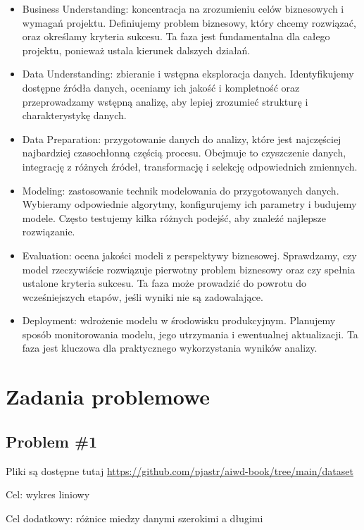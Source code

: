 \documentclass[
  polish,
  letterpaper,
  DIV=11,
  numbers=noendperiod]{scrreprt}
\begin{document}
\begin{itemize}
\item
  Business Understanding: koncentracja na zrozumieniu celów biznesowych
  i wymagań projektu. Definiujemy problem biznesowy, który chcemy
  rozwiązać, oraz określamy kryteria sukcesu. Ta faza jest fundamentalna
  dla całego projektu, ponieważ ustala kierunek dalszych działań.
\item
  Data Understanding: zbieranie i wstępna eksploracja danych.
  Identyfikujemy dostępne źródła danych, oceniamy ich jakość i
  kompletność oraz przeprowadzamy wstępną analizę, aby lepiej zrozumieć
  strukturę i charakterystykę danych.
\item
  Data Preparation: przygotowanie danych do analizy, które jest
  najczęściej najbardziej czasochłonną częścią procesu. Obejmuje to
  czyszczenie danych, integrację z różnych źródeł, transformację i
  selekcję odpowiednich zmiennych.
\item
  Modeling: zastosowanie technik modelowania do przygotowanych danych.
  Wybieramy odpowiednie algorytmy, konfigurujemy ich parametry i
  budujemy modele. Często testujemy kilka różnych podejść, aby znaleźć
  najlepsze rozwiązanie.
\item
  Evaluation: ocena jakości modeli z perspektywy biznesowej. Sprawdzamy,
  czy model rzeczywiście rozwiązuje pierwotny problem biznesowy oraz czy
  spełnia ustalone kryteria sukcesu. Ta faza może prowadzić do powrotu
  do wcześniejszych etapów, jeśli wyniki nie są zadowalające.
\item
  Deployment: wdrożenie modelu w środowisku produkcyjnym. Planujemy
  sposób monitorowania modelu, jego utrzymania i ewentualnej
  aktualizacji. Ta faza jest kluczowa dla praktycznego wykorzystania
  wyników analizy.
\end{itemize}

\part{Zadania problemowe}

\chapter{Problem \#1}\label{problem-1}

Pliki są dostępne tutaj
\url{https://github.com/pjastr/aiwd-book/tree/main/dataset}

Cel: wykres liniowy

Cel dodatkowy: różnice miedzy danymi szerokimi a długimi
\end{document}
